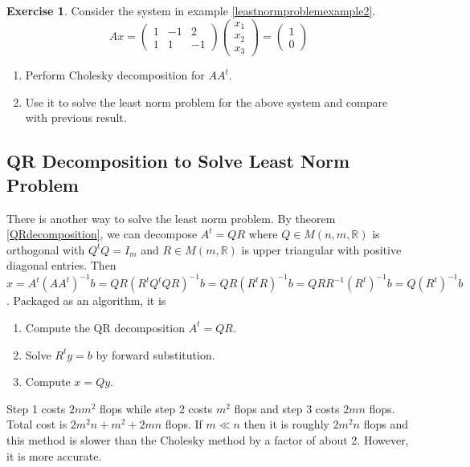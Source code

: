 \documentclass[12pt]{amsart}
\theoremstyle{definition}
\newtheorem{exercise}[theorem]{Exercise}
\begin{document}
\begin{exercise}\label{leastnormproblemCholeskydecompositionexercise} Consider the system in example \ref{leastnormproblemexample2}.
$$Ax = \left(\begin{array}{ccc} 1 & -1 & 2 \\ 1 & 1 & -1 \end{array}\right) \left(\begin{array}{c} x_1 \\ x_2 \\ x_3 \end{array}\right) = \left(\begin{array}{c} 1 \\ 0 \end{array}\right)$$
\begin{enumerate}[\indent a.]
\item Perform Cholesky decomposition for $AA^t$.
\item Use it to solve the least norm problem for the above system and compare with previous result.
\end{enumerate}
\end{exercise}

\subsection{QR Decomposition to Solve Least Norm Problem} There is another way to solve the least norm problem. By theorem \ref{QRdecomposition}, we can decompose $A^t = QR$ where $Q \in M(n, m, \mathbb{R})$ is orthogonal with $Q^tQ = I_m$ and $R \in M(m, \mathbb{R})$ is upper triangular with positive diagonal entries. Then $\hat{x} = A^t(AA^t)^{-1}b = QR(R^tQ^tQR)^{-1}b = QR(R^tR)^{-1}b = QRR^{-1}(R^t)^{-1}b = Q(R^t)^{-1}b$. Packaged as an algorithm, it is
\begin{enumerate}[\indent 1.]
\item Compute the QR decomposition $A^t = QR$.
\item Solve $R^ty = b$ by forward substitution.
\item Compute $x = Qy$.
\end{enumerate}

Step 1 costs $2nm^2$ flops while step 2 costs $m^2$ flops and step 3 costs $2mn$ flops. Total cost is $2m^2n + m^2 + 2mn$ flops. If $m \ll n$ then it is roughly $2m^2n$ flops and this method is slower than the Cholesky method by a factor of about 2. However, it is more accurate.
\end{document}
